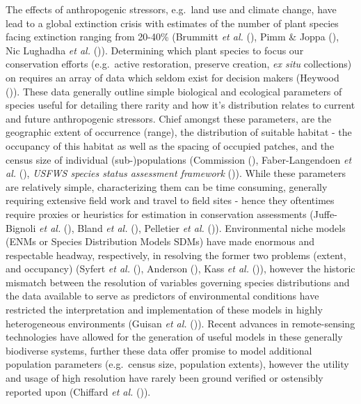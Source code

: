 \documentclass[
]{article}
\begin{document}
The effects of anthropogenic stressors, e.g.~land use and climate
change, have lead to a global extinction crisis with estimates of the
number of plant species facing extinction ranging from 20-40\% (Brummitt
\emph{et al.} (), Pimm \& Joppa
(), Nic Lughadha \emph{et al.}
()). Determining which plant
species to focus our conservation efforts (e.g.~active restoration,
preserve creation, \emph{ex situ} collections) on requires an array of
data which seldom exist for decision makers (Heywood
()). These data generally outline
simple biological and ecological parameters of species useful for
detailing there rarity and how it's distribution relates to current and
future anthropogenic stressors. Chief amongst these parameters, are the
geographic extent of occurrence (range), the distribution of suitable
habitat - the occupancy of this habitat as well as the spacing of
occupied patches, and the census size of individual (sub-)populations
(Commission (), Faber-Langendoen
\emph{et al.} (), \emph{USFWS
species status assessment framework}
()). While these parameters are
relatively simple, characterizing them can be time consuming, generally
requiring extensive field work and travel to field sites - hence they
oftentimes require proxies or heuristics for estimation in conservation
assessments (Juffe-Bignoli \emph{et al.}
(), Bland \emph{et al.}
(), Pelletier \emph{et al.}
()). Environmental niche
models (ENMs or Species Distribution Models SDMs) have made enormous and
respectable headway, respectively, in resolving the former two problems
(extent, and occupancy) (Syfert \emph{et al.}
(), Anderson
(), Kass \emph{et al.}
()), however the historic mismatch
between the resolution of variables governing species distributions and
the data available to serve as predictors of environmental conditions
have restricted the interpretation and implementation of these models in
highly heterogeneous environments (Guisan \emph{et al.}
()). Recent advances in
remote-sensing technologies have allowed for the generation of useful
models in these generally biodiverse systems, further these data offer
promise to model additional population parameters (e.g.~census size,
population extents), however the utility and usage of high resolution
have rarely been ground verified or ostensibly reported upon (Chiffard
\emph{et al.} ()).
\end{document}
